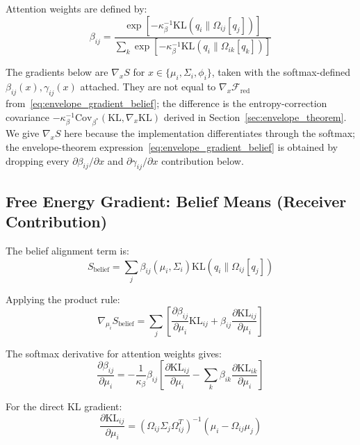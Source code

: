\documentclass[11pt]{article}
\begin{document}
Attention weights are defined by:
\begin{equation}
\beta_{ij} = \frac{\exp\left[-\kappa_\beta^{-1}\mathrm{KL}(q_i \| \Omega_{ij}[q_j])\right]}{\sum_k \exp\left[-\kappa_\beta^{-1}\mathrm{KL}(q_i \| \Omega_{ik}[q_k])\right]}
\end{equation}

The gradients below are $\nabla_x S$ for $x \in \{\mu_i, \Sigma_i, \phi_i\}$, taken with the softmax-defined $\beta_{ij}(x), \gamma_{ij}(x)$ attached. They are not equal to $\nabla_x \mathcal{F}_{\mathrm{red}}$ from~\eqref{eq:envelope_gradient_belief}; the difference is the entropy-correction covariance $-\kappa_\beta^{-1}\mathrm{Cov}_{\beta^*}(\mathrm{KL}, \nabla_x \mathrm{KL})$ derived in Section~\ref{sec:envelope_theorem}. We give $\nabla_x S$ here because the implementation differentiates through the softmax; the envelope-theorem expression~\eqref{eq:envelope_gradient_belief} is obtained by dropping every $\partial \beta_{ij}/\partial x$ and $\partial \gamma_{ij}/\partial x$ contribution below.

\subsection*{Free Energy Gradient: Belief Means (Receiver Contribution)}

The belief alignment term is:
\begin{equation}
S_{\mathrm{belief}} = \sum_j \beta_{ij}(\mu_i, \Sigma_i)  \mathrm{KL}(q_i \| \Omega_{ij}[q_j])
\end{equation}

Applying the product rule:
\begin{equation}
\nabla_{\mu_i} S_{\mathrm{belief}} = \sum_j \left[ \frac{\partial \beta_{ij}}{\partial \mu_i} \mathrm{KL}_{ij} + \beta_{ij} \frac{\partial \mathrm{KL}_{ij}}{\partial \mu_i} \right]
\end{equation}

The softmax derivative for attention weights gives:
\begin{equation}
\frac{\partial \beta_{ij}}{\partial \mu_i} = -\frac{1}{\kappa_\beta} \beta_{ij} \left[\frac{\partial \mathrm{KL}_{ij}}{\partial \mu_i} - \sum_k \beta_{ik} \frac{\partial \mathrm{KL}_{ik}}{\partial \mu_i}\right]
\end{equation}

For the direct KL gradient:
\begin{equation}
\frac{\partial \mathrm{KL}_{ij}}{\partial \mu_i} = (\Omega_{ij}\Sigma_j\Omega_{ij}^T)^{-1}(\mu_i - \Omega_{ij}\mu_j)
\end{equation}
\end{document}
